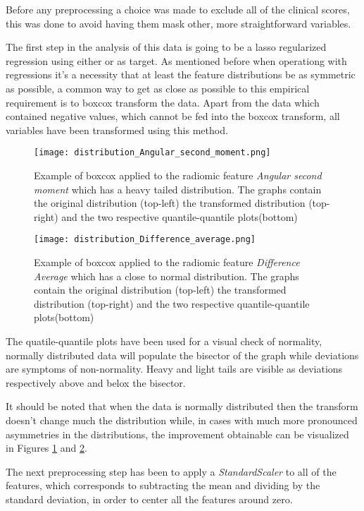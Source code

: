 Before any preprocessing a choice was made to exclude all of the clinical scores, this was done to avoid having them mask other, more straightforward variables.

The first step in the analysis of this data is going to be a lasso regularized regression using either \death or \icu as target. As mentioned before when operationg with regressions it's a necessity that at least the feature distributions be as symmetric as possible, a common way to get as close as possible to this empirical requirement is to boxcox transform the data. Apart from the data which contained negative values, which cannot be fed into the boxcox transform, all variables have been transformed using this method.

\begin{figure}[htbp]
  		\texttt{[image: distribution\_Angular\_second\_moment.png]}
        \caption{Example of boxcox applied to the radiomic feature \textit{Angular second moment} which has a heavy tailed distribution. The graphs contain the original distribution (top-left) the transformed distribution (top-right) and the two respective quantile-quantile plots(bottom) \label{fig:boxcox_example}}
\end{figure}

\begin{figure}[htbp]
  		\texttt{[image: distribution\_Difference\_average.png]}
        \caption{Example of boxcox applied to the radiomic feature \textit{Difference Average} which has a close to normal distribution. The graphs contain the original distribution (top-left) the transformed distribution (top-right) and the two respective quantile-quantile plots(bottom) \label{fig:boxcox_example_normal}}
\end{figure}

The quatile-quantile plots have been used for a visual check of normality, normally distributed data will populate the bisector of the graph while deviations are symptoms of non-normality. Heavy and light tails are visible as deviations respectively above and belox the bisector.

It should be noted that when the data is normally distributed then the transform doesn't change much the distribution while, in cases with much more pronounced asymmetries in the distributions, the improvement obtainable can be visualized in Figures \ref{fig:boxcox_example} and \ref{fig:boxcox_example_normal}.

The next preprocessing step has been to apply a \textit{StandardScaler} to all of the features, which corresponds to subtracting the mean and dividing by the standard deviation, in order to center all the features around zero. 

